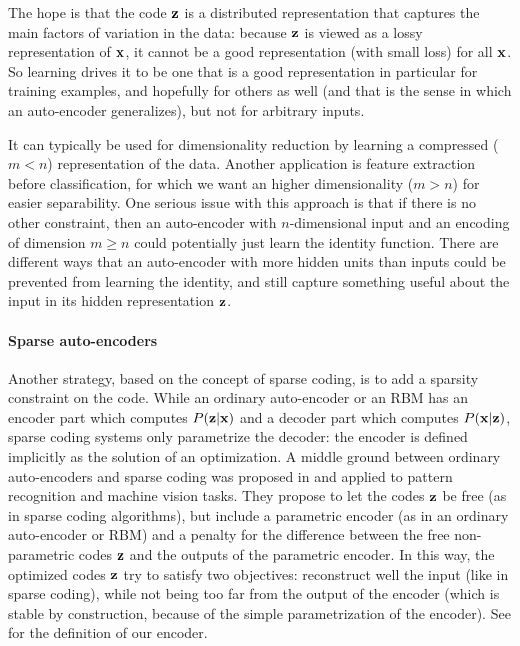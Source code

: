 The hope is that the code $\mathbf{z}$ is a distributed representation that captures the main factors of variation in the data: because $\mathbf{z}$ is viewed as a lossy representation of $\mathbf{x}$, it cannot be a good representation (with small loss) for all $\mathbf{x}$. So learning drives it to be one that is a good representation in particular for training examples, and hopefully for others as well (and that is the sense in which an auto-encoder generalizes), but not for arbitrary inputs.

It can typically be used for dimensionality reduction by learning a compressed ($m<n$) representation of the data. Another application is feature extraction before classification, for which we want an higher dimensionality ($m>n$) for easier separability. One serious issue with this approach is that if there is no other constraint, then an auto-encoder with $n$-dimensional input and an encoding of dimension $m \geq n$ could potentially just learn the identity function. There are different ways that an auto-encoder with more hidden units than inputs could be prevented from learning the identity, and still capture something useful about the input in its hidden representation $\mathbf{z}$.

\paragraph{Sparse auto-encoders}
Another strategy, based on the concept of sparse coding, is to add a sparsity constraint on the code. While an ordinary auto-encoder or an \gls{RBM} has an encoder part which computes $P(\mathbf{z}|\mathbf{x})$ and a decoder part which computes $P(\mathbf{x}|\mathbf{z})$, sparse coding systems only parametrize the decoder: the encoder is defined implicitly as the solution of an optimization. A middle ground between ordinary auto-encoders and sparse coding was proposed in \cite{lecun2006stackedSparseAutoencoders, ranzato2007stackedSparseAutoencoders} and applied to pattern recognition and machine vision tasks. They propose to let the codes $\mathbf{z}$ be free (as in sparse coding algorithms), but include a parametric encoder (as in an ordinary auto-encoder or \gls{RBM}) and a penalty for the difference between the free non-parametric codes $\mathbf{z}$ and the outputs of the parametric encoder. In this way, the optimized codes $\mathbf{z}$ try to satisfy two objectives: reconstruct well the input (like in sparse coding), while not being too far from the output of the encoder (which is stable by construction, because of the simple parametrization of the encoder). See  for the definition of our encoder.

